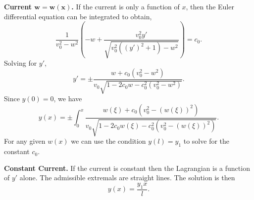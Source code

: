 \begin{Solution}
  \textbf{Current $\mathbf{w = w(x)}$.}
  If the current is only a function of $x$, then the Euler differential
  equation can be integrated to obtain,
  \[
  \frac{1}{v_0^2 - w^2} 
  \left( - w + \frac{v_0^2 y'}{\sqrt{ v_0^2 ((y')^2 + 1) - w^2 }} \right)
  = c_0.
  \]
  Solving for $y'$, 
  \[
  y' = \pm \frac{w + c_0 ( v_0^2 - w^2 ) }
  { v_0 \sqrt{ 1 - 2 c_0 w - c_0^2 (v_0^2 - w^2 ) } }.
  \]
  Since $y(0) = 0$, we have
  \[
  \boxed{
    y(x) = \pm \int_0^x \frac{w(\xi) + c_0 ( v_0^2 - (w(\xi))^2 ) }
    { v_0 \sqrt{ 1 - 2 c_0 w(\xi) - c_0^2 (v_0^2 - (w(\xi))^2 ) } }.
    }
  \]
  For any given $w(x)$ we can use the condition $y(l) = y_1$ to solve for 
  the constant $c_0$.


  \textbf{Constant Current.}
  If the current is constant then the Lagrangian is a function of $y'$ alone.
  The admissible extremals are straight lines.  The solution is then
  \[
  \boxed{
    y(x) = \frac{y_1 x}{l}.
    }
  \]
\end{Solution}




